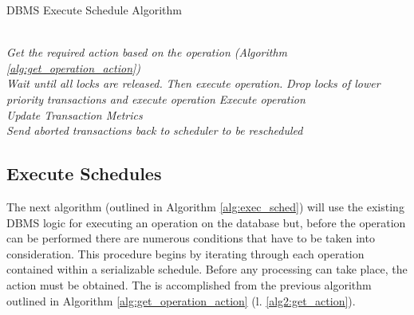 \documentclass[conference]{IEEEtran}
\begin{document}
\begin{algorithm}
\caption{DBMS Execute Schedule Algorithm}
\label{alg:exec_sched}
\begin{algorithmic}[1]

    \\
        \State \textit{Get the required action based on}
        \State \textit{the operation (Algorithm \ref{alg:get_operation_action})} \label{alg2:get_action}
        \\
         \label{alg2:decline_action}
            \State \textit{Wait until all locks are released.}
            \State \textit{Then execute operation.}
        \label{alg2:elev_action}
            \State \textit{Drop locks of lower priority }
            \State \textit{transactions and execute operation}
        \label{alg2:grant_action}
            \State \textit{Execute operation}
        \EndIf
    \EndFor
    \\
    \State \textit{Update Transaction Metrics}\label{alg2:update_metrics}
    \\
    \State \textit{Send aborted transactions back to}
    \State \textit{scheduler to be rescheduled}\label{alg2:abort}
\EndProcedure

\end{algorithmic}
\end{algorithm}

\subsection{Execute Schedules}

The next algorithm (outlined in Algorithm \ref{alg:exec_sched}) will use the existing DBMS logic for executing an operation on the database but, before the operation can be performed there are numerous conditions that have to be taken into consideration. This procedure begins by iterating through each operation contained within a serializable schedule. Before any processing can take place, the action must be obtained. The is accomplished from the previous algorithm outlined in Algorithm \ref{alg:get_operation_action} (l. \ref{alg2:get_action}).
\end{document}
